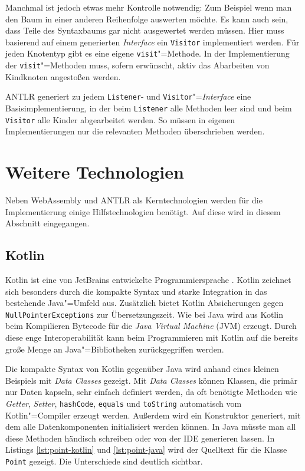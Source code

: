 Manchmal ist jedoch etwas mehr Kontrolle notwendig: Zum Beispiel wenn man den Baum in einer anderen Reihenfolge auswerten möchte. Es kann auch sein, dass Teile des Syntaxbaums gar nicht ausgewertet werden müssen. Hier muss basierend auf einem generierten \emph{Interface} ein \lstinline{Visitor} implementiert werden. Für jeden Knotentyp gibt es eine eigene \lstinline{visit}"=Methode. In der Implementierung der \lstinline{visit}"=Methoden muss, sofern erwünscht, aktiv das Abarbeiten von Kindknoten angestoßen werden.

ANTLR generiert zu jedem \lstinline{Listener}- und \lstinline{Visitor}"=\emph{Interface} eine Basisimplementierung, in der beim \lstinline{Listener} alle Methoden leer sind und beim \lstinline{Visitor} alle Kinder abgearbeitet werden. So müssen in eigenen Implementierungen nur die relevanten Methoden überschrieben werden.

\pagebreak
\section{Weitere Technologien}

Neben WebAssembly und ANTLR als Kerntechnologien werden für die Implementierung einige Hilfstechnologien benötigt. Auf diese wird in diesem Abschnitt eingegangen.

\subsection{Kotlin}
\label{subsec:Kotlin}

Kotlin ist eine von JetBrains entwickelte Programmiersprache \cite{KotlinReference}. Kotlin zeichnet sich besonders durch die kompakte Syntax und starke Integration in das bestehende Java"=Umfeld aus. Zusätzlich bietet Kotlin Absicherungen gegen \lstinline{NullPointerExceptions} zur Übersetzungszeit. Wie bei Java wird aus Kotlin beim Kompilieren Bytecode für die \emph{Java Virtual Machine} (JVM) erzeugt. Durch diese enge Interoperabilität kann beim Programmieren mit Kotlin auf die bereits große Menge an Java"=Bibliotheken zurückgegriffen werden.

Die kompakte Syntax von Kotlin gegenüber Java wird anhand eines kleinen Beispiels mit \emph{Data Classes} gezeigt. Mit \emph{Data Classes} können Klassen, die primär nur Daten kapseln, sehr einfach definiert werden, da oft benötigte Methoden wie \emph{Getter}, \emph{Setter}, \lstinline{hashCode}, \lstinline{equals} und \lstinline{toString} automatisch vom Kotlin"=Compiler erzeugt werden. Außerdem wird ein Konstruktor generiert, mit dem alle Datenkomponenten initialisiert werden können. In Java müsste man all diese Methoden händisch schreiben oder von der IDE generieren lassen. In Listings \ref{lst:point-kotlin} und \ref{lst:point-java} wird der Quelltext für die Klasse \lstinline{Point} gezeigt. Die Unterschiede sind deutlich sichtbar.

